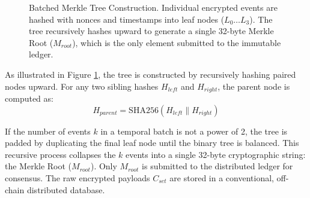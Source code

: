 \documentclass[conference]{IEEEtran}
\begin{document}
\begin{figure}[htbp]
\centering
{}
\caption{Batched Merkle Tree Construction. Individual encrypted events are hashed with nonces and timestamps into leaf nodes ($L_0 \dots L_3$). The tree recursively hashes upward to generate a single 32-byte Merkle Root ($M_{root}$), which is the only element submitted to the immutable ledger.}
\label{fig:merkle}
\end{figure}

As illustrated in Figure \ref{fig:merkle}, the tree is constructed by recursively hashing paired nodes upward. For any two sibling hashes $H_{left}$ and $H_{right}$, the parent node is computed as:
\begin{equation}
H_{parent} = \text{SHA256}(H_{left} \parallel H_{right})
\end{equation}

If the number of events $k$ in a temporal batch is not a power of 2, the tree is padded by duplicating the final leaf node until the binary tree is balanced. This recursive process collapses the $k$ events into a single 32-byte cryptographic string: the Merkle Root ($M_{root}$). Only $M_{root}$ is submitted to the distributed ledger for consensus. The raw encrypted payloads $C_{set}$ are stored in a conventional, off-chain distributed database. 
\end{document}
